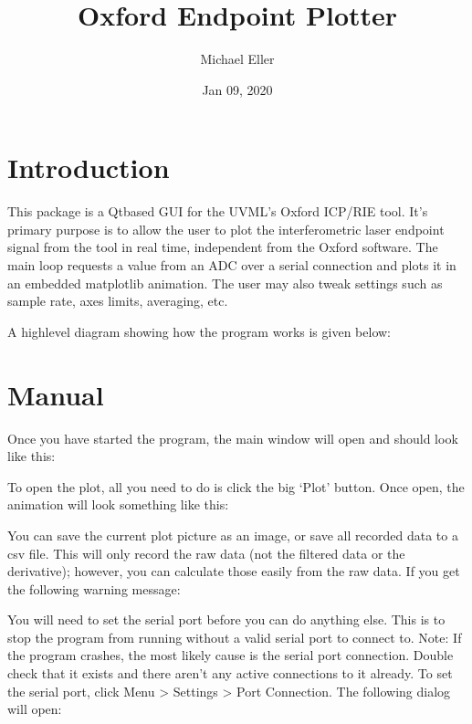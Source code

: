 \documentclass[letterpaper,10pt,english]{sphinxmanual}
\title{Oxford Endpoint Plotter}
\date{Jan 09, 2020}
\author{Michael Eller}
\begin{document}
\pagestyle{empty}
\sphinxmaketitle
\pagestyle{plain}
\sphinxtableofcontents
\pagestyle{normal}
\label{\detokenize{index::doc}}



\chapter{Introduction}
\label{\detokenize{introduction:introduction}}\label{\detokenize{introduction::doc}}
This package is a Qt\sphinxhyphen{}based GUI for the UVML’s Oxford ICP/RIE tool. It’s primary purpose is to allow the user to plot the interferometric laser endpoint signal from the tool in real time, independent from the Oxford software. The main loop requests a value from an ADC over a serial connection and plots it in an embedded matplotlib animation. The user may also tweak settings such as sample rate, axes limits, averaging, etc.

A high\sphinxhyphen{}level diagram showing how the program works is given below:

\noindent{}


\chapter{Manual}
\label{\detokenize{manual:manual}}\label{\detokenize{manual::doc}}
Once you have started the program, the main window will open and should look like this:

\noindent{}

To open the plot, all you need to do is click the big ‘Plot’ button. Once open, the animation will look something like this:

\noindent{}

You can save the current plot picture as an image, or save all recorded data to a csv file. This will only record the raw data (not the filtered data or the derivative); however, you can calculate those easily from the raw data. If you get the following warning message:

\noindent{}

You will need to set the serial port before you can do anything else. This is to stop the program from running without a valid serial port to connect to. Note: If the program crashes, the most likely cause is the serial port connection. Double check that it exists and there aren’t any active connections to it already. To set the serial port, click Menu \textgreater{} Settings \textgreater{} Port Connection. The following dialog will open:
\end{document}
